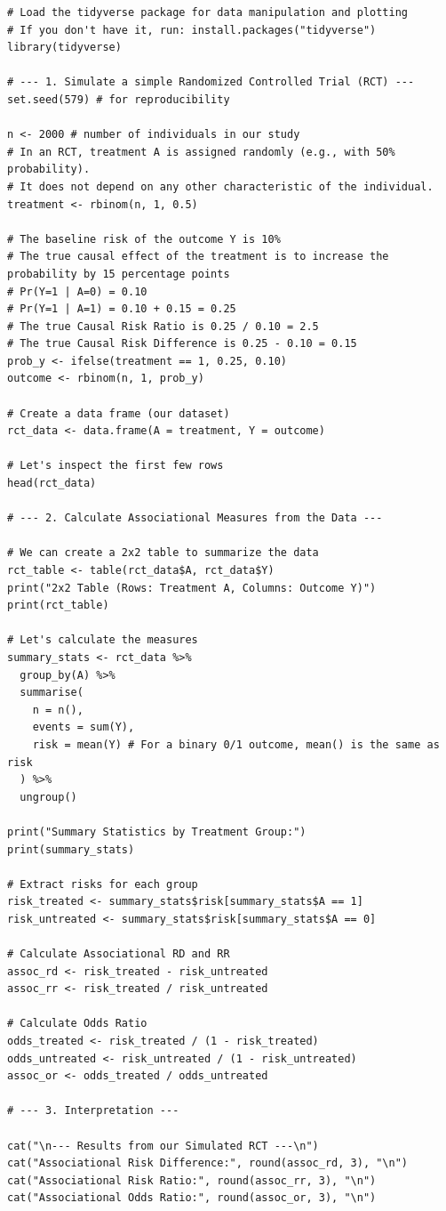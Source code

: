 \documentclass[
  10pt,
  letterpaper,
  DIV=11,
  numbers=noendperiod]{scrartcl}
\begin{document}
\begin{verbatim}
# Load the tidyverse package for data manipulation and plotting
# If you don't have it, run: install.packages("tidyverse")
library(tidyverse)

# --- 1. Simulate a simple Randomized Controlled Trial (RCT) ---
set.seed(579) # for reproducibility

n <- 2000 # number of individuals in our study
# In an RCT, treatment A is assigned randomly (e.g., with 50% probability).
# It does not depend on any other characteristic of the individual.
treatment <- rbinom(n, 1, 0.5)

# The baseline risk of the outcome Y is 10%
# The true causal effect of the treatment is to increase the probability by 15 percentage points
# Pr(Y=1 | A=0) = 0.10
# Pr(Y=1 | A=1) = 0.10 + 0.15 = 0.25
# The true Causal Risk Ratio is 0.25 / 0.10 = 2.5
# The true Causal Risk Difference is 0.25 - 0.10 = 0.15
prob_y <- ifelse(treatment == 1, 0.25, 0.10)
outcome <- rbinom(n, 1, prob_y)

# Create a data frame (our dataset)
rct_data <- data.frame(A = treatment, Y = outcome)

# Let's inspect the first few rows
head(rct_data)

# --- 2. Calculate Associational Measures from the Data ---

# We can create a 2x2 table to summarize the data
rct_table <- table(rct_data$A, rct_data$Y)
print("2x2 Table (Rows: Treatment A, Columns: Outcome Y)")
print(rct_table)

# Let's calculate the measures
summary_stats <- rct_data %>%
  group_by(A) %>%
  summarise(
    n = n(),
    events = sum(Y),
    risk = mean(Y) # For a binary 0/1 outcome, mean() is the same as risk
  ) %>%
  ungroup()

print("Summary Statistics by Treatment Group:")
print(summary_stats)

# Extract risks for each group
risk_treated <- summary_stats$risk[summary_stats$A == 1]
risk_untreated <- summary_stats$risk[summary_stats$A == 0]

# Calculate Associational RD and RR
assoc_rd <- risk_treated - risk_untreated
assoc_rr <- risk_treated / risk_untreated

# Calculate Odds Ratio
odds_treated <- risk_treated / (1 - risk_treated)
odds_untreated <- risk_untreated / (1 - risk_untreated)
assoc_or <- odds_treated / odds_untreated

# --- 3. Interpretation ---

cat("\n--- Results from our Simulated RCT ---\n")
cat("Associational Risk Difference:", round(assoc_rd, 3), "\n")
cat("Associational Risk Ratio:", round(assoc_rr, 3), "\n")
cat("Associational Odds Ratio:", round(assoc_or, 3), "\n")
\end{verbatim}
\end{document}
